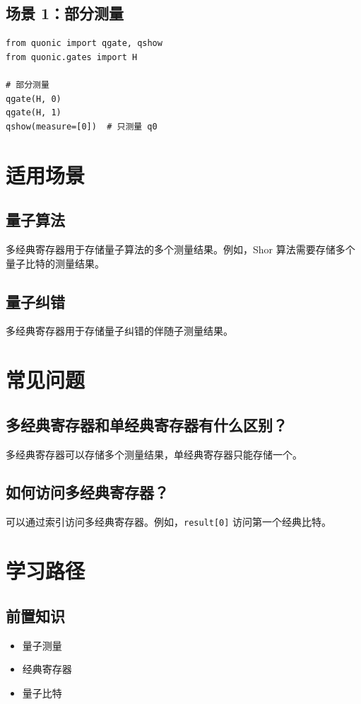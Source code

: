 \documentclass[12pt,a4paper]{article}
\begin{document}
\subsection{场景 1：部分测量}

\begin{verbatim}
from quonic import qgate, qshow
from quonic.gates import H

# 部分测量
qgate(H, 0)
qgate(H, 1)
qshow(measure=[0])  # 只测量 q0
\end{verbatim}

\section{适用场景}

\subsection{量子算法}

多经典寄存器用于存储量子算法的多个测量结果。例如，Shor 算法需要存储多个量子比特的测量结果。

\subsection{量子纠错}

多经典寄存器用于存储量子纠错的伴随子测量结果。

\section{常见问题}

\subsection{多经典寄存器和单经典寄存器有什么区别？}

多经典寄存器可以存储多个测量结果，单经典寄存器只能存储一个。

\subsection{如何访问多经典寄存器？}

可以通过索引访问多经典寄存器。例如，\texttt{result[0]} 访问第一个经典比特。

\section{学习路径}

\subsection{前置知识}
\begin{itemize}
  \item 量子测量
  \item 经典寄存器
  \item 量子比特
\end{itemize}
\end{document}

